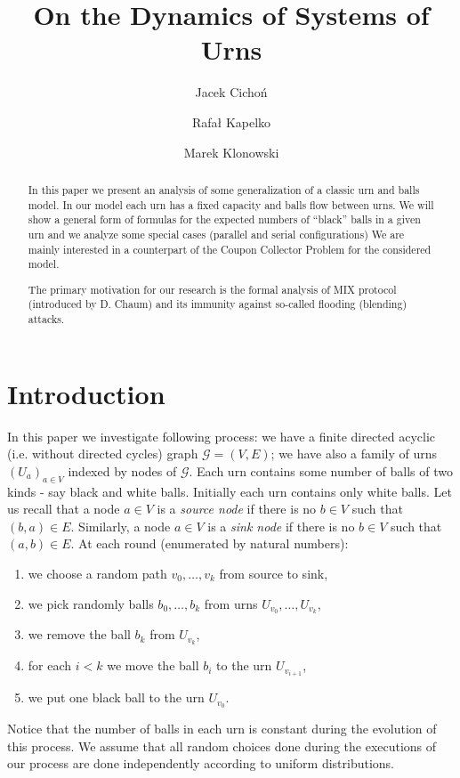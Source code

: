 \documentclass[submission]{dmtcs}
\title{
	On the Dynamics of Systems of Urns
}
\author{
	Jacek Cicho\'{n} \and 
	Rafa{\l} Kapelko \and 
	Marek Klonowski
}
\newcommand{\Marek} [1]{\marginpar{\scriptsize {\bf MKlo}:#1}}
\begin{document}
\maketitle

\begin{abstract}
In this paper we present an analysis of some generalization of a classic 
urn and balls model. In our model each urn has a fixed capacity 
and balls flow between urns. 
We will show a general form of formulas for the expected numbers of ``black'' balls in a 
given urn and we analyze some special cases (parallel and serial configurations)
We are mainly interested in a counterpart of the Coupon Collector Problem 
for the considered model. 

The primary motivation for our research is the formal analysis of  MIX protocol (introduced by D. Chaum) 
and its immunity against so-called flooding (blending) attacks. 
\end{abstract}


\section{Introduction}

In this paper we investigate following process: we have a finite directed 
acyclic (i.e. without directed cycles) graph  $\mathcal{G} = (V,E)$; we have also a family of urns 
$(U_a)_{a \in V}$ indexed by nodes of  $\mathcal{G}$. 
Each urn contains some number of balls of two kinds - say black and white balls.  
Initially each urn contains only white balls. 
Let us recall that a node $a\in V$ is a \textit{source node} if there is no $b\in V$
such that $(b,a) \in E$. Similarly, a node $a\in V$ is a \textit{sink node} 
if there is no $b\in V$ such that $(a,b) \in E$.
At each round (enumerated by natural numbers): 
\begin{enumerate}
\item we choose a random path $v_0,\ldots,v_k$ from source to sink, 
\item we pick randomly balls $b_0, \ldots, b_k$ from urns $U_{v_0}, \ldots, U_{v_k}$, 
\item we remove the ball  $b_k$ from $U_{v_k}$,
\item for each $i<k$ we move the ball $b_i$ to the urn  $U_{v_{i+1}}$,
\item we put one black ball to the urn $U_{v_0}$.
\end{enumerate}
Notice that the number of balls in each urn is constant during the evolution
of this process. We assume that all 
random choices done during the executions of our process are  done independently 
according to uniform distributions.
\end{document}
